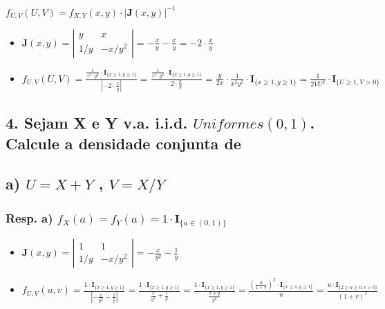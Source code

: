 \documentclass[english]{article}
\begin{document}
$f_{U,V}(U,V)=f_{X,Y}(x,y)\cdot\left|\mathbf{J}(x,y)\right|^{-1}$
\begin{itemize}
\item $\mathbf{J}(x,y)=\left|\begin{array}{cc}
y & x\\
1/y & -x/y^{2}
\end{array}\right|=-\frac{x}{y}-\frac{x}{y}=-2\cdot\frac{x}{y}$
\item $f_{U,V}(U,V)=\frac{\frac{1}{x^{2}\cdot y^{2}}\cdot\mathbf{I}_{\{x\ge1,y\ge1\}}}{\left|-2\cdot\frac{x}{y}\right|}=\frac{\frac{1}{x^{2}\cdot y^{2}}\cdot\mathbf{I}_{\{x\ge1,y\ge1\}}}{2\cdot\frac{x}{y}}=\frac{y}{2x}\cdot\frac{1}{x^{2}y^{2}}\cdot\mathbf{I}_{\{x\ge1,y\ge1\}}=\frac{1}{2VU^{2}}\cdot\mathbf{I}_{\{U\ge1,V>0\}}$
\end{itemize}

\subsection*{\textcompwordmark{}}


\subsection*{\textmd{4. Sejam X e Y v.a. i.i.d. $Uniformes(0,1)$. Calcule a densidade
conjunta de}}


\subsection*{\textmd{a) $U=X+Y$ , $V=X/Y$ }}


\subsubsection*{\textmd{Resp}. \textmd{a) $f_{X}(a)=f_{Y}(a)=1\cdot\mathbf{I}_{\{a\in(0,1)\}}$}}
\begin{itemize}
\item $\mathbf{J}(x,y)=\left|\begin{array}{cc}
1 & 1\\
1/y & -x/y^{2}
\end{array}\right|=-\frac{x}{y^{2}}-\frac{1}{y}$
\item $f_{U,V}(u,v)=\frac{1\cdot\mathbf{I}_{\{x\ge1,y\ge1\}}}{\left|-\frac{x}{y^{2}}-\frac{1}{y}\right|}=\frac{1\cdot\mathbf{I}_{\{x\ge1,y\ge1\}}}{\frac{x}{y^{2}}+\frac{1}{y}}=\frac{1\cdot\mathbf{I}_{\{x\ge1,y\ge1\}}}{\frac{x+y}{y^{2}}}=\frac{(\frac{u}{1+v})^{2}\cdot\mathbf{I}_{\{x\ge1,y\ge1\}}}{u}=\frac{u\cdot\mathbf{I}_{\{2\ge u\ge0,v>0\}}}{(1+v)^{2}}$
\end{itemize}
\end{document}
